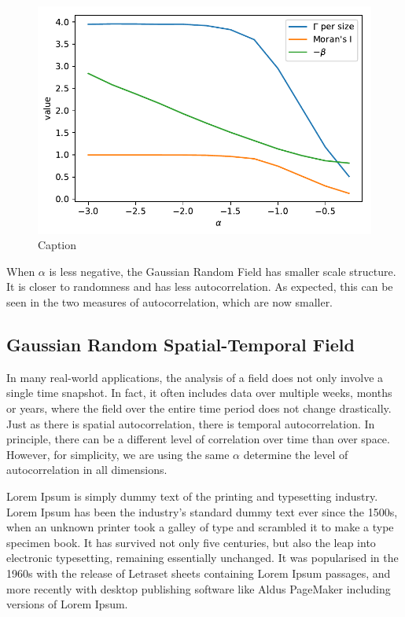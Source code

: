 \documentclass{acm_proc_article-sp}
\begin{document}
\begin{figure}[h]
\begin{center}
\includegraphics[width=0.8\columnwidth]{Results/plotGammaAndMoransIAndBeta.pdf}
\caption[Small caption]{Caption}
\label{fig:plotGammaAndMoransIAndBeta}
\end{center}
\end{figure}
When $\alpha$ is less negative, the Gaussian Random Field has smaller scale structure. It is closer to randomness and has less autocorrelation. As expected, this can be seen in the two measures of autocorrelation, which are now smaller.

\subsection{Gaussian Random Spatial-Temporal Field}
\label{sec:Introduction Gaussian Random Spatial-Temporal Field}

In many real-world applications, the analysis of a field does not only involve a single time snapshot. In fact, it often includes data over multiple weeks, months or years, where the field over the entire time period does not change drastically. Just as there is spatial autocorrelation, there is temporal autocorrelation. In principle, there can be a different level of correlation over time than over space. However, for simplicity, we are using the same $\alpha$ determine the level of autocorrelation in all dimensions.

Lorem Ipsum is simply dummy text of the printing and typesetting industry. Lorem Ipsum has been the industry's standard dummy text ever since the 1500s, when an unknown printer took a galley of type and scrambled it to make a type specimen book. It has survived not only five centuries, but also the leap into electronic typesetting, remaining essentially unchanged. It was popularised in the 1960s with the release of Letraset sheets containing Lorem Ipsum passages, and more recently with desktop publishing software like Aldus PageMaker including versions of Lorem Ipsum.
\end{document}
